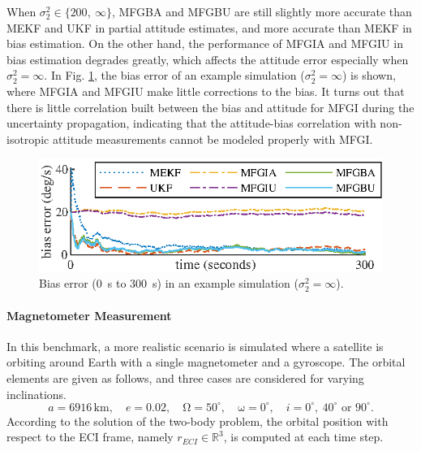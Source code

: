 When $\sigma_2^2 \in \{200,\ \infty\}$, MFGBA and MFGBU are still slightly more accurate than MEKF and UKF in partial attitude estimates, and more accurate than MEKF in bias estimation.
On the other hand, the performance of MFGIA and MFGIU in bias estimation degrades greatly, which affects the attitude error especially when $\sigma_2^2 = \infty$.
In Fig. \ref{fig:attEst-sim2-trajectory-bias}, the bias error of an example simulation ($\sigma_2^2=\infty$) is shown, where MFGIA and MFGIU make little corrections to the bias.
It turns out that there is little correlation built between the bias and attitude for MFGI during the uncertainty propagation, indicating that the attitude-bias correlation with non-isotropic attitude measurements cannot be modeled properly with MFGI.

\begin{figure}
	\centering
	\includegraphics[scale=1.4]{figures/attEst-sim2-trajectory-bias}
	\caption{Bias error (\SI{0}{\second} to \SI{300}{\second}) in an example simulation ($\sigma_2^2=\infty$). \label{fig:attEst-sim2-trajectory-bias}}
\end{figure}

\paragraph{Magnetometer Measurement}

In this benchmark, a more realistic scenario is simulated where a satellite is orbiting around Earth with a single magnetometer and a gyroscope.
The orbital elements are given as follows, and three cases are considered for varying inclinations. 
\begin{equation*}
	a=6916\,\mathrm{km},\quad
	e=0.02,\quad
	\mathrm{\Omega} = 50^\circ,\quad
	\mathrm{\omega} = 0^\circ,\quad
	i = 0^\circ,\ 40^\circ \text{ or } 90^\circ.
\end{equation*}
According to the solution of the two-body problem, the orbital position with respect to the ECI frame, namely $r_{ECI}\in\mathbb{R}^3$, is computed at each time step.

